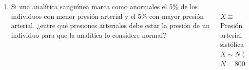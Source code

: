 \documentclass[aspectratio=149,10pt,t]{beamer}
\begin{document}
\begin{frame}
	\begin{columns}
		\begin{column}[T]{0.7\textwidth}
			\begin{enumerate}
			  \item[3.] Si una analítica sanguínea marca como anormales el 5\% de los individuos con menor presión arterial y el 5\% con mayor presión arterial, ¿entre qué presiones arteriales debe estar la presión de un individuo para que la analítica lo considere normal?
			\end{enumerate}
		\end{column}
		\begin{column}[T]{0.3\textwidth}
			\\
			$X\equiv$ Presión arterial sistólica\\
			$X\sim N(118.7,\,19.42)$\\
			$N=8000$
		\end{column}
	\end{columns}
\end{frame}
\end{document}
